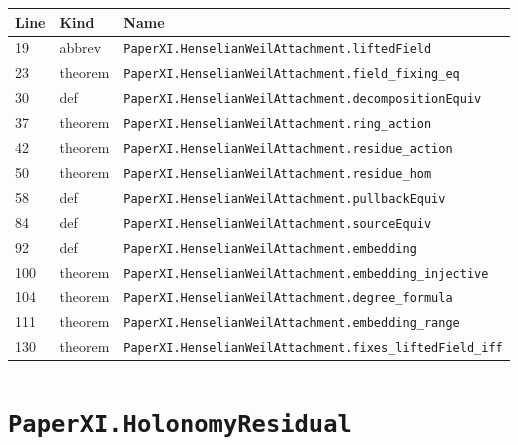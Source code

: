 \documentclass[10pt,oneside]{book}
\begin{document}
\begin{longtable}{@{}p{}p{}p{}@{}}\toprule Line&Kind&Name\\\midrule\endhead

19&abbrev&\nolinkurl{PaperXI.HenselianWeilAttachment.liftedField}\\

23&theorem&\nolinkurl{PaperXI.HenselianWeilAttachment.field_fixing_eq}\\

30&def&\nolinkurl{PaperXI.HenselianWeilAttachment.decompositionEquiv}\\

37&theorem&\nolinkurl{PaperXI.HenselianWeilAttachment.ring_action}\\

42&theorem&\nolinkurl{PaperXI.HenselianWeilAttachment.residue_action}\\

50&theorem&\nolinkurl{PaperXI.HenselianWeilAttachment.residue_hom}\\

58&def&\nolinkurl{PaperXI.HenselianWeilAttachment.pullbackEquiv}\\

84&def&\nolinkurl{PaperXI.HenselianWeilAttachment.sourceEquiv}\\

92&def&\nolinkurl{PaperXI.HenselianWeilAttachment.embedding}\\

100&theorem&\nolinkurl{PaperXI.HenselianWeilAttachment.embedding_injective}\\

104&theorem&\nolinkurl{PaperXI.HenselianWeilAttachment.degree_formula}\\

111&theorem&\nolinkurl{PaperXI.HenselianWeilAttachment.embedding_range}\\

130&theorem&\nolinkurl{PaperXI.HenselianWeilAttachment.fixes_liftedField_iff}\\

\bottomrule\end{longtable}

\section{\texorpdfstring{\nolinkurl{PaperXI.HolonomyResidual}}{PaperXI.HolonomyResidual}}\label{module:PaperXI.HolonomyResidual}
\end{document}
